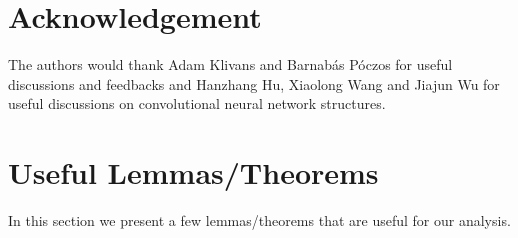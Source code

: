 \documentclass[11pt]{article}
\begin{document}
\section{Acknowledgement}
\label{sec:ack}
The authors would thank Adam Klivans and Barnab\'{a}s P\'{o}czos for useful discussions and feedbacks and Hanzhang Hu, Xiaolong Wang and Jiajun Wu for useful discussions on convolutional neural network structures.










\newpage
\appendix
\section{Useful Lemmas/Theorems}\label{sec:useful_lemmas}
In this section we present a few lemmas/theorems that are useful for our analysis.
\end{document}
